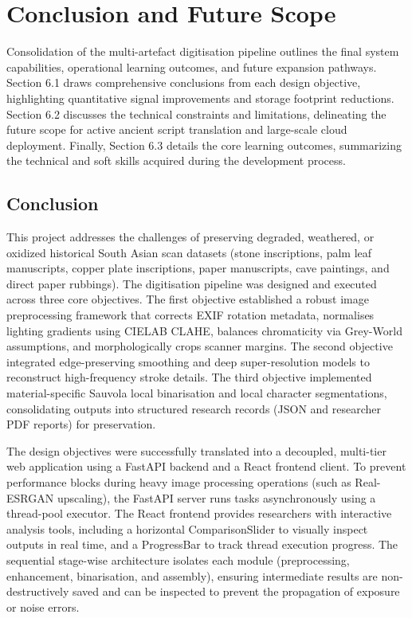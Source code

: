 \chapter{Conclusion and Future Scope}

Consolidation of the multi-artefact digitisation pipeline outlines the final system capabilities, operational learning outcomes, and future expansion pathways. Section 6.1 draws comprehensive conclusions from each design objective, highlighting quantitative signal improvements and storage footprint reductions. Section 6.2 discusses the technical constraints and limitations, delineating the future scope for active ancient script translation and large-scale cloud deployment. Finally, Section 6.3 details the core learning outcomes, summarizing the technical and soft skills acquired during the development process.

\section{Conclusion}

This project addresses the challenges of preserving degraded, weathered, or oxidized historical South Asian scan datasets (stone inscriptions, palm leaf manuscripts, copper plate inscriptions, paper manuscripts, cave paintings, and direct paper rubbings). The digitisation pipeline was designed and executed across three core objectives. The first objective established a robust image preprocessing framework that corrects EXIF rotation metadata, normalises lighting gradients using CIELAB CLAHE, balances chromaticity via Grey-World assumptions, and morphologically crops scanner margins. The second objective integrated edge-preserving smoothing and deep super-resolution models to reconstruct high-frequency stroke details. The third objective implemented material-specific Sauvola local binarisation and local character segmentations, consolidating outputs into structured research records (JSON and researcher PDF reports) for preservation.

The design objectives were successfully translated into a decoupled, multi-tier web application using a FastAPI backend and a React frontend client. To prevent performance blocks during heavy image processing operations (such as Real-ESRGAN upscaling), the FastAPI server runs tasks asynchronously using a thread-pool executor. The React frontend provides researchers with interactive analysis tools, including a horizontal ComparisonSlider to visually inspect outputs in real time, and a ProgressBar to track thread execution progress. The sequential stage-wise architecture isolates each module (preprocessing, enhancement, binarisation, and assembly), ensuring intermediate results are non-destructively saved and can be inspected to prevent the propagation of exposure or noise errors.

